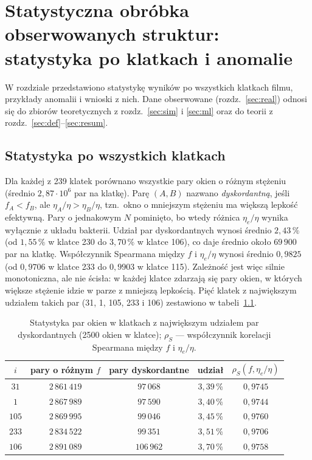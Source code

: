 \documentclass[12pt,a4paper,twoside,openright]{report}
\theoremstyle{definition}
\theoremstyle{remark}
\begin{document}
\chapter{\texorpdfstring{Statystyczna obróbka obserwowanych struktur: statystyka po klatkach i anomalie}{Statystyczna obróbka obserwowanych struktur: statystyka po klatkach i anomalie}}\label{sec:realstat}

W rozdziale przedstawiono statystykę wyników po wszystkich klatkach filmu, przykłady anomalii i wnioski z nich. Dane obserwowane (rozdz.~\ref{sec:real}) odnosi się do zbiorów teoretycznych z rozdz.~\ref{sec:sim} i \ref{sec:ml} oraz do teorii z rozdz.~\ref{sec:def}--\ref{sec:resum}.

\section{\texorpdfstring{Statystyka po wszystkich klatkach}{Statystyka po wszystkich klatkach}}

Dla każdej z 239 klatek porównano wszystkie pary okien o różnym stężeniu (średnio $2{,}87\cdot10^6$ par na klatkę). Parę $(A,B)$ nazwano \emph{dyskordantną}, jeśli $f_A<f_B$, ale $\eta_A/\eta>\eta_B/\eta$, tzn.\ okno o mniejszym stężeniu ma większą lepkość efektywną. Pary o jednakowym $N$ pominięto, bo wtedy różnica $\eta_e/\eta$ wynika wyłącznie z układu bakterii. Udział par dyskordantnych wynosi średnio $2{,}43\,\%$ (od $1{,}55\,\%$ w klatce 230 do $3{,}70\,\%$ w klatce 106), co daje średnio około $69\,900$ par na klatkę. Współczynnik Spearmana między $f$ i $\eta_e/\eta$ wynosi średnio $0{,}9825$ (od $0{,}9706$ w klatce 233 do $0{,}9903$ w klatce 115). Zależność jest więc silnie monotoniczna, ale nie ścisła: w każdej klatce zdarzają się pary okien, w których większe stężenie idzie w parze z mniejszą lepkością. Pięć klatek z największym udziałem takich par (31, 1, 105, 233 i 106) zestawiono w tabeli~\ref{tab:realstat}.
\begin{table}[htbp]
\centering\small
\caption{Statystyka par okien w klatkach z największym udziałem par dyskordantnych (2500 okien w klatce); $\rho_S$ --- współczynnik korelacji Spearmana między $f$ i $\eta_e/\eta$.}\label{tab:realstat}
\begin{tabular}{@{}ccccc@{}}
\toprule
\textbf{$i$} & \textbf{pary o różnym $f$} & \textbf{pary dyskordantne} & \textbf{udział} & \textbf{$\rho_S(f,\eta_e/\eta)$}\\
\midrule
$31$ & $2\,861\,419$ & $97\,068$ & $3{,}39\,\%$ & $0{,}9745$\\
$1$ & $2\,867\,989$ & $97\,590$ & $3{,}40\,\%$ & $0{,}9744$\\
$105$ & $2\,869\,995$ & $99\,046$ & $3{,}45\,\%$ & $0{,}9760$\\
$233$ & $2\,834\,522$ & $99\,351$ & $3{,}51\,\%$ & $0{,}9706$\\
$106$ & $2\,891\,089$ & $106\,962$ & $3{,}70\,\%$ & $0{,}9758$\\
\bottomrule
\end{tabular}
\end{table}
\end{document}
